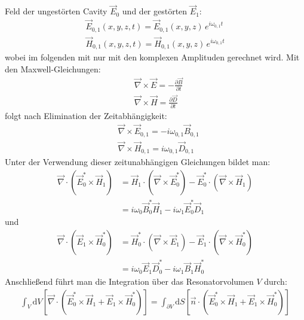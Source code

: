 \documentclass[11pt, a4paper]{scrbook}
\newcommand{\vnabla}{\vec{\nabla}}
\newcommand{\ve}{\vec{E}}
\newcommand{\vb}{\vec{B}}
\newcommand{\vh}{\vec{H}}
\newcommand{\vd}{\vec{D}}
\begin{document}
	
	Feld der ungestörten Cavity $\ve_0$ und der gestörten $\ve_1$:
	\begin{subequations}
		\begin{align}
		\ve_{0,1}(x,y,z,t) = \ve_{0,1}(x,y,z) \, e^{i \omega_{0,1} t} \\
		\vh_{0,1}(x,y,z,t) = \vh_{0,1}(x,y,z) \, e^{i \omega_{0,1} t}
		\end{align}
	\end{subequations}
	wobei im folgenden mit nur mit den komplexen Amplituden gerechnet wird.
	Mit den Maxwell-Gleichungen:
	\begin{subequations}
		\begin{align}
			&\vnabla \times \ve = - \frac{\partial \vb}{\partial t} \\
			&\vnabla \times \vh = \frac{\partial \vd}{\partial t}
		\end{align}
	\end{subequations}
	folgt nach Elimination der Zeitabhängigkeit:
	\begin{subequations}
		\begin{align}
			&\vnabla \times \ve_{0,1} = - i \omega_{0,1} \vb_{0,1} \\
			&\vnabla \times \vh_{0,1} = i \omega_{0,1} \vd_{0,1}
		\end{align}
	\end{subequations}
	Unter der Verwendung dieser zeitunabhängigen Gleichungen bildet man:
	\begin{align}
	\vnabla \cdot \left( \ve_0^* \times \vh_1\right) &= \vh_1 \cdot \left( \vnabla \times \ve_0^* \right) - \ve_0^* \cdot \left( \vnabla \times \vh_1 \right) \nonumber \\
	&= i \omega_0 \vb_0^* \vh_1 - i \omega_1 \ve_0^* \vd_1 \label{eq:e0h1}
	\end{align}
	und
	\begin{align}
		\vnabla \cdot \left( \ve_1 \times \vh_0^* \right) &= \vh_0^* \cdot \left( \vnabla \times \ve_1 \right) - \ve_1 \cdot \left( \vnabla \times \vh_0^* \right) \nonumber \\
		&= i \omega_0 \ve_1 \vd_0^* - i \omega_1 \vb_1 \vh_0^* \label{eq:e1h0}
	\end{align}
	Anschließend führt man die Integration über das Resonatorvolumen $V$ durch:
	\begin{align}
		\int_{V} \mathrm{d}V \left[ \vnabla \cdot \left( \ve_0^* \times \vh_1 + \ve_1 \times \vh_0^* \right) \right] = \int_{\partial V} \mathrm{d}S \left[ \vec{n} \cdot \left( \ve_0^* \times \vh_1 + \ve_1 \times \vh_0^* \right)\right] \label{eq:volint}
	\end{align}
\end{document}
